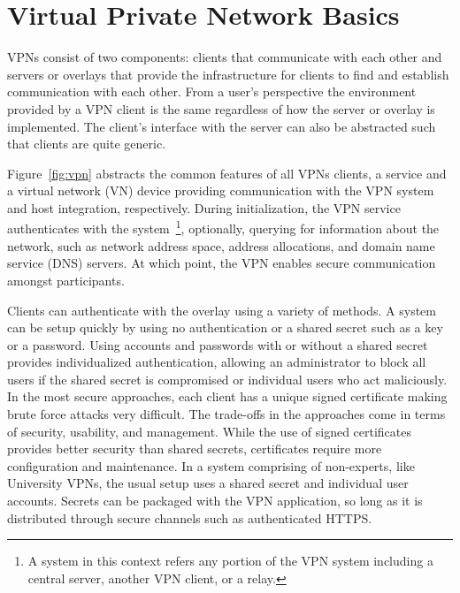 \section{Virtual Private Network Basics}
VPNs consist of two components: clients that communicate with each other and
servers or overlays that provide the infrastructure for clients to find and
establish communication with each other.  From a user's perspective the
environment provided by a VPN client is the same regardless of how the server
or overlay is implemented.  The client's interface with the server can also
be abstracted such that clients are quite generic.

Figure~\ref{fig:vpn} abstracts the common features of all VPNs clients, a
service and a virtual network (VN) device providing communication with the VPN
system and host integration, respectively.  During initialization, the VPN
service authenticates with the system~\footnote{A system in this context refers
any portion of the VPN system including a central server, another VPN client,
or a relay.}, optionally, querying for information about the network, such as
network address space, address allocations, and domain name service (DNS)
servers.  At which point, the VPN enables secure communication amongst
participants.

Clients can authenticate with the overlay using a variety of methods.  A system
can be setup quickly by using no authentication or a shared secret such as a key
or a password.  Using accounts and passwords with or without a shared secret
provides individualized authentication, allowing an administrator to block all
users if the shared secret is compromised or individual users who act
maliciously.  In the most secure approaches, each client has a unique signed
certificate making brute force attacks very difficult.  The trade-offs in the
approaches come in terms of security, usability, and management.  While the use
of signed certificates provides better security than shared secrets,
certificates require more configuration and maintenance.  In a system comprising
of non-experts, like University VPNs, the usual setup uses a shared secret and
individual user accounts.  Secrets can be packaged with the VPN application, so
long as it is distributed through secure channels such as authenticated HTTPS.

